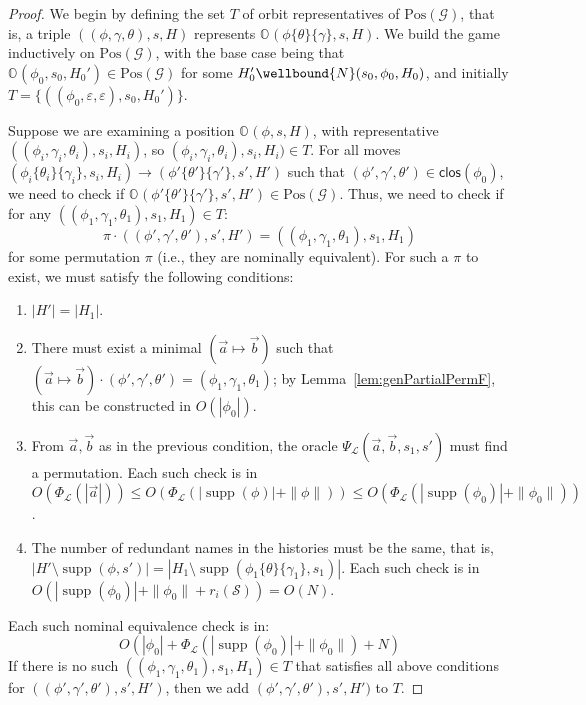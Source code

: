 \documentclass[10pt,a4paper]{article}
\theoremstyle{definition}
\theoremstyle{remark}
\newcommand\pos[0]{\mathrm{Pos}}
\newcommand\regindex[0]{r_i}
\DeclareMathOperator{\supp}{supp}
\newcommand\Gcal{\mathcal{G}}
\newcommand\Lcal{\mathcal{L}}
\newcommand\Scal{\mathcal{S}}
\newcommand\orbs[1][]{\mathbb{O}_{#1}}
\newcommand{\move}[2]{(#1\mapsto#2)}
\newcommand{\clos}[0]{\mathsf{clos}}
\begin{document}
\begin{proof}
	We begin by defining the set $T$ of orbit representatives of $\pos(\Gcal)$, that is, a triple $((\phi, \gamma, \theta), s, H)$ represents $\orbs(\phi\{\theta\}\{\gamma\}, s, H)$.
	We build the game inductively on $\pos(\Gcal)$, with the base case being that $\orbs(\phi_0, s_0, H_0') \in \pos(\Gcal)$ for some $H_0'\wellbound{N}(s_0,\phi_0,H_0)$, and initially $T = \{((\phi_0, \varepsilon, \varepsilon), s_0, H_0')\}$.
	
	Suppose we are examining a position $\orbs( \phi,  s,  H)$, 
	with representative $((\phi_i, \gamma_i, \theta_i), s_i, H_i)$, so $(\phi_i, \gamma_i, \theta_i), s_i, H_i) \in T$. 
	For all moves $(\phi_i\{\theta_i\}\{\gamma_i\}, s_i, H_i) \to (\phi'\{\theta'\}\{\gamma'\}, s', H')$ such that $(\phi', \gamma', \theta') \in \clos(\phi_0)$, we need to check if $\orbs(\phi'\{\theta'\}\{\gamma'\}, s', H') \in \pos(\Gcal)$. 
	Thus, we need to check if for any $((\phi_1, \gamma_1, \theta_1), s_1, H_1) \in T$:
	$$\pi \cdot ((\phi', \gamma', \theta'), s', H') = ((\phi_1, \gamma_1, \theta_1), s_1, H_1)$$ 
	for some permutation $\pi$ (i.e., they are nominally equivalent).
	For such a $\pi$ to exist, we must satisfy the following conditions:
	\begin{enumerate}
		\item $|H'| = |H_1|$.
				\item There must exist a minimal $\move{\vec a}{\vec b}$ such that $\move{\vec a}{\vec b} \cdot (\phi', \gamma', \theta') = (\phi_1, \gamma_1, \theta_1)$; 
	 	by Lemma~\ref{lem:genPartialPermF}, this can be constructed in $O(|\phi_0|)$.
				\item From $\vec a, \vec b$ as in the previous condition, the oracle $\Psi_\Lcal(\vec a, \vec b, s_1, s')$ must find a permutation.
		Each such check is in $O(\Phi_\Lcal(|\vec a|)) \le O(\Phi_\Lcal(|\supp(\phi)| + \|\phi\|)) \le O(\Phi_\Lcal(|\supp(\phi_0)| + \|\phi_0\|))$. 
				\item The number of redundant names in the histories must be the same, that is, $|H' \setminus \supp(\phi, s')| = |H_1 \setminus \supp(\phi_1\{\theta\}\{\gamma_1\}, s_1)|$. 
		Each such check is in $O(|\supp(\phi_0)| + \|\phi_0\| + \regindex(\Scal)) = O(N)$.
	\end{enumerate}
	Each such nominal equivalence check is in:
	\[
	O(
	|\phi_0| + \Phi_\Lcal(|\supp(\phi_0)| + \|\phi_0\|) + N
	)
	\]
	If there is no such $((\phi_1, \gamma_1, \theta_1), s_1, H_1) \in T$ that satisfies all above conditions for $((\phi', \gamma', \theta'), s', H')$, then we add $(\phi', \gamma', \theta'), s', H')$ to $T$.
		

\end{proof}
\end{document}
